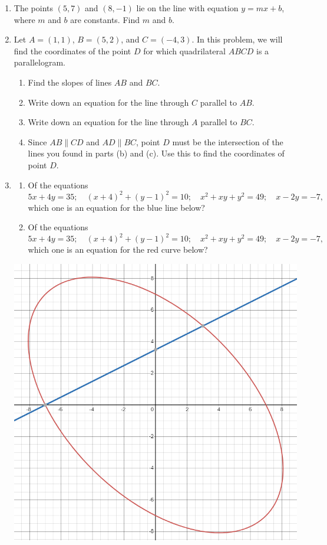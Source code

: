 \documentclass{article}
\begin{document}
\begin{enumerate}
\item The points $(5,7)$ and $(8,-1)$ lie on the line with equation $y = mx + b$, where $m$ and $b$ are constants. Find $m$ and $b$.
\item Let $A = (1,1)$, $B = (5,2)$, and $C = (-4,3)$. In this problem, we will find the coordinates of the point $D$ for which quadrilateral $ABCD$ is a parallelogram.
\begin{enumerate}
\item Find the slopes of lines $AB$ and $BC$.
\item Write down an equation for the line through $C$ parallel to $AB$.
\item Write down an equation for the line through $A$ parallel to $BC$.
\item Since $AB\parallel CD$ and $AD\parallel BC$, point $D$ must be the intersection of the lines you found in parts (b) and (c). Use this to find the coordinates of point $D$.
\end{enumerate}
\item \begin{enumerate}
\item Of the equations
\begin{equation*}
5x + 4y = 35;\quad (x + 4)^2 + (y - 1)^2 = 10;\quad x^2 + xy + y^2 = 49;\quad x - 2y = -7,
\end{equation*}
which one is an equation for the blue line below?
\item Of the equations
\begin{equation*}
5x + 4y = 35;\quad (x + 4)^2 + (y - 1)^2 = 10;\quad x^2 + xy + y^2 = 49;\quad x - 2y = -7,
\end{equation*}
which one is an equation for the red curve below?
\end{enumerate}
\begin{center}
\includegraphics[scale=0.5]{graphing-line-ellipse.png}
\end{center}
\end{enumerate}
\end{document}
